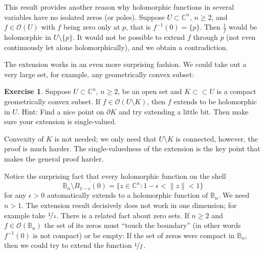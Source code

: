 \documentclass[12pt,openany]{book}
\newcommand{\snorm}[1]{\lVert {#1} \rVert}
\newcommand{\C}{{\mathbb{C}}}
\newcommand{\bB}{{\mathbb{B}}}
\newcommand{\sO}{{\mathscr{O}}}
\theoremstyle{plain}
\theoremstyle{remark}
\theoremstyle{definition}
\newenvironment{exbox}{%
    \def\FrameCommand{\vrule width 1pt \relax\hspace{10pt}}%
    \MakeFramed{\advance\hsize-\width\FrameRestore}%
}{%
    \endMakeFramed
}
\theoremstyle{exercise}
\newtheorem{exercise}{Exercise}[section]
\theoremstyle{example}
\begin{document}
This result provides another reason why holomorphic functions in several
variables have no isolated zeros (or poles).  Suppose $U \subset \C^n$,
$n \geq 2$, and $f \in \sO(U)$ with $f$ being zero only at $p$, that
is $f^{-1}(0) = \{ p \}$.  Then $\frac{1}{f}$ would be holomorphic in
$U \setminus \{ p \}$.  It would not be possible to extend $f$
through $p$ (not even continuously let alone holomorphically),
and we obtain a contradiction.

The extension works in an even more surprising fashion.  We could
take out a very large set, for example, any geometrically
convex subset:

\begin{exbox}
\begin{exercise} \label{exercise:convexhartogs}
Suppose $U \subset \C^n$, $n \geq 2$, be an open set and $K \subset \subset U$
is a compact geometrically
convex subset.
If $f \in \sO(U \setminus K)$,
then $f$ extends to be holomorphic in $U$.
Hint: Find a nice point on $\partial K$ and try extending a little bit.
Then make sure your extension is single-valued.
\end{exercise}
\end{exbox}

Convexity of $K$ is not needed; we only need that $U\setminus K$
is connected, however, the proof is much harder.
The single-valuedness of the extension is the key point that makes the
general proof harder.

Notice the surprising fact that every holomorphic function on
the shell
\begin{equation*}
\bB_n \setminus \overline{B_{1-\epsilon}(0)} =
\bigl\{ z \in \C^n : 1-\epsilon < \snorm{z} < 1 \bigr\}
\end{equation*}
for any $\epsilon > 0$ automatically
extends to a holomorphic function of $\bB_n$.  We need $n > 1$.
The extension result decisively does not work in one dimension; for
example take $\nicefrac{1}{z}$.
There is a related fact about zero sets.
If $n \geq 2$ and $f \in \sO(\bB_n)$
the set of its zeros must 
``touch the boundary'' (in other words $f^{-1}(0)$ is not compact)
or be empty:  If the set of zeros were 
compact in $\bB_n$, then we could try to
extend the function $\nicefrac{1}{f}$.
\end{document}
